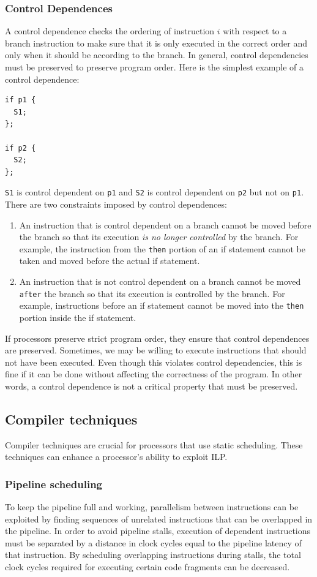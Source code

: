 \documentclass[11pt]{article}
\begin{document}
\subsubsection{Control Dependences}
A control dependence checks the ordering of instruction $i$ with respect to a branch instruction to make sure that it is only executed in the correct order and only when it should be according to the branch. In general, control dependencies must be preserved to preserve program order. Here is the simplest example of a control dependence:
\begin{lstlisting}[caption={Simple if then statement showing control dependences}, captionpos=b]
if p1 {
  S1;
};

if p2 {
  S2;
};
\end{lstlisting}
\noindent
\texttt{S1} is control dependent on \texttt{p1} and \texttt{S2} is control dependent on \texttt{p2} but not on \texttt{p1}. There are two constraints imposed by control dependences:
\begin{enumerate}
\item An instruction that is control dependent on a branch cannot be moved before the branch so that its execution \textit{is no longer controlled} by the branch. For example, the instruction from the \texttt{then} portion of an if statement cannot be taken and moved before the actual if statement.
\item An instruction that is not control dependent on a branch cannot be moved \texttt{after} the branch so that its execution is controlled by the branch. For example, instructions before an if statement cannot be moved into the \texttt{then} portion inside the if statement.
\end{enumerate}
\noindent
If processors preserve strict program order, they ensure that control dependences are preserved. Sometimes, we may be willing to execute instructions that should not have been executed. Even though this violates control dependencies, this is fine if it can be done without affecting the correctness of the program. In other words, a control dependence is not a critical property that must be preserved. 

\subsection{Compiler techniques}
Compiler techniques are crucial for processors that use static scheduling. These techniques can enhance a processor's ability to exploit ILP.

\subsubsection{Pipeline scheduling}
To keep the pipeline full and working, parallelism between instructions can be exploited by finding sequences of unrelated instructions that can be overlapped in the pipeline. In order to avoid pipeline stalls, execution of dependent instructions must be separated by a distance in clock cycles equal to the pipeline latency of that instruction.
\n
By scheduling overlapping instructions during stalls, the total clock cycles required for executing certain code fragments can be decreased.
\end{document}
